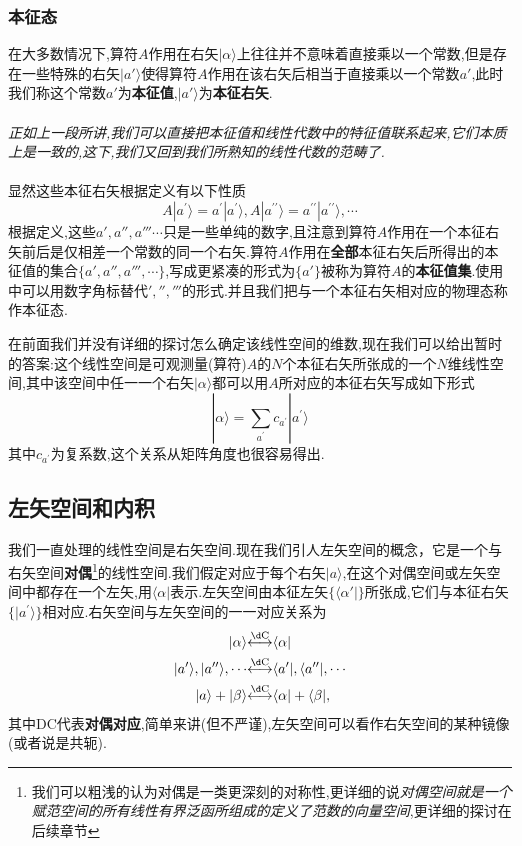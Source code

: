 \documentclass[lang=cn,newtx,10pt,scheme=chinese,thmcnt=section]{elegantbook}
\begin{document}
\subsubsection*{本征态}
在大多数情况下,算符$A$作用在右矢$|\alpha\rangle$上往往并不意味着直接乘以一个常数,但是存在一些特殊的右矢$|a'\rangle$使得算符$A$作用在该右矢后相当于直接乘以一个常数$a'$,此时我们称这个常数$a'$为\textbf{本征值},$|a'\rangle$为\textbf{本征右矢}.\\\\
\textit{正如上一段所讲,我们可以直接把本征值和线性代数中的特征值联系起来,它们本质上是一致的,这下,我们又回到我们所熟知的线性代数的范畴了.}\\\\
显然这些本征右矢根据定义有以下性质
\begin{equation}
	A| a^{\prime}\rangle=a^{\prime}| a^{\prime}\rangle,A| a^{\prime\prime}\rangle=a^{\prime\prime}| a^{\prime\prime}\rangle,\cdots
\end{equation}
根据定义,这些$a',a'',a'''\cdots$只是一些单纯的数字,且注意到算符$A$作用在一个本征右矢前后是仅相差一个常数的同一个右矢.算符$A$作用在\textbf{全部}本征右矢后所得出的本征值的集合$\{a',a'',a''',\cdots\}$,写成更紧凑的形式为$\{a'\}$被称为算符$A$的\textbf{本征值集}.使用中可以用数字角标替代$','','''$的形式.并且我们把与一个本征右矢相对应的物理态称作本征态.

在前面我们并没有详细的探讨怎么确定该线性空间的维数,现在我们可以给出暂时的答案:这个线性空间是可观测量(算符)$A$的$N$个本征右矢所张成的一个$N$维线性空间,其中该空间中任一一个右矢$|\alpha\rangle$都可以用$A$所对应的本征右矢写成如下形式
\begin{equation}
	|\alpha\rangle=\sum_{a^{\prime}}c_{a^{\prime}}| a^{\prime}\rangle 
\end{equation}
其中$c_{a^{\prime}}$为复系数,这个关系从矩阵角度也很容易得出.
\subsection*{左矢空间和内积}
我们一直处理的线性空间是右矢空间.现在我们引人左矢空间的概念，它是一个与右矢空间\textbf{对偶}\footnote{我们可以粗浅的认为对偶是一类更深刻的对称性,更详细的说\textit{对偶空间就是一个赋范空间的所有线性有界泛函所组成的定义了范数的向量空间},更详细的探讨在后续章节}的线性空间.我们假定对应于每个右矢$|a\rangle$,在这个对偶空间或左矢空间中都存在一个左矢,用$\langle\alpha|$表示.左矢空间由本征左矢$\{\langle\alpha'|\}$所张成,它们与本征右矢$\{|a^{\prime}\rangle\}$相对应.右矢空间与左矢空间的一一对应关系为
\begin{equation}
	\begin{aligned}|\alpha\rangle&\overset{\mathrm{\d C}}{\operatorname*{\longleftrightarrow}}\langle\alpha|\\| a^{\prime}\rangle,| a^{\prime\prime}\rangle,\cdotp\cdotp\cdotp&\overset{\mathrm{\d C}}{\operatorname*{\longleftrightarrow}}\langle a^{\prime}|,\langle a^{\prime\prime}|,\cdotp\cdotp\cdotp\\| a\rangle+|\beta\rangle&\overset{\mathrm{\d C}}{\operatorname*{\longleftrightarrow}}\langle\alpha|+\langle\beta|,\end{aligned}
\end{equation}
其中DC代表\textbf{对偶对应},简单来讲(但不严谨),左矢空间可以看作右矢空间的某种镜像(或者说是共轭).
\end{document}
